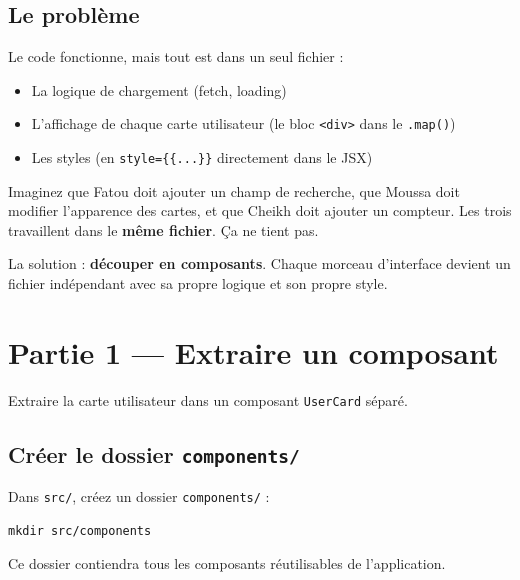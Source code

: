 \documentclass[11pt,a4paper]{article}
\begin{document}
\subsection{Le problème}

Le code fonctionne, mais tout est dans un seul fichier :

\begin{itemize}[nosep]
    \item La logique de chargement (fetch, loading)
    \item L'affichage de chaque carte utilisateur (le bloc \texttt{<div>} dans le \texttt{.map()})
    \item Les styles (en \texttt{style=\{\{...\}\}} directement dans le JSX)
\end{itemize}

Imaginez que Fatou doit ajouter un champ de recherche, que Moussa doit modifier l'apparence des cartes, et que Cheikh doit ajouter un compteur. Les trois travaillent dans le \textbf{même fichier}. Ça ne tient pas.

La solution : \textbf{découper en composants}. Chaque morceau d'interface devient un fichier indépendant avec sa propre logique et son propre style.

\section{Partie 1 --- Extraire un composant}
\label{sec:composant}

\begin{objectifbox}
Extraire la carte utilisateur dans un composant \texttt{UserCard} séparé.
\end{objectifbox}

\subsection{Créer le dossier \texttt{components/}}

Dans \texttt{src/}, créez un dossier \texttt{components/} :

\begin{lstlisting}[style=terminal]
mkdir src/components
\end{lstlisting}

Ce dossier contiendra tous les composants réutilisables de l'application.
\end{document}
